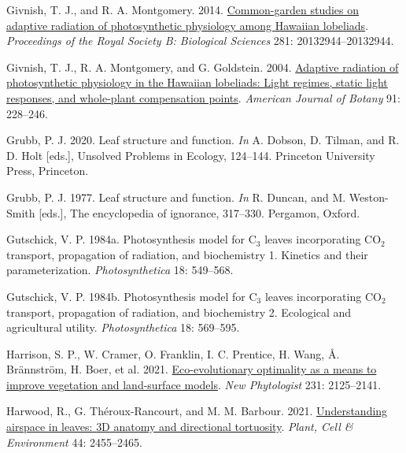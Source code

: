 \documentclass[
  letterpaper,
  DIV=11,
  numbers=noendperiod]{scrartcl}
\newlength{\cslhangindent}
\newlength{\cslentryspacingunit} %
\newenvironment{CSLReferences}[2] %
 {%
  \setlength{\parindent}{0pt}
  \ifodd #1
  \let\oldpar\par
  \def\par{\hangindent=\cslhangindent\oldpar}
  \fi
  \setlength{\parskip}{#2\cslentryspacingunit}
 }%
 {}
\begin{document}
\begin{CSLReferences}{1}{0}
\leavevmode{}%
Givnish, T. J., and R. A. Montgomery. 2014.
\href{https://doi.org/10.1098/rspb.2013.2944}{Common-garden studies on
adaptive radiation of photosynthetic physiology among {Hawaiian}
lobeliads}. \emph{Proceedings of the Royal Society B: Biological
Sciences} 281: 20132944--20132944.

\leavevmode{}%
Givnish, T. J., R. A. Montgomery, and G. Goldstein. 2004.
\href{https://doi.org/10.3732/ajb.91.2.228}{Adaptive radiation of
photosynthetic physiology in the {Hawaiian} lobeliads: Light regimes,
static light responses, and whole-plant compensation points}.
\emph{American Journal of Botany} 91: 228--246.

\leavevmode{}%
Grubb, P. J. 2020. Leaf structure and function. \emph{In} A. Dobson, D.
Tilman, and R. D. Holt {[}eds.{]}, Unsolved {Problems} in {Ecology},
124--144. Princeton University Press, Princeton.

\leavevmode{}%
Grubb, P. J. 1977. Leaf structure and function. \emph{In} R. Duncan, and
M. Weston-Smith {[}eds.{]}, The encyclopedia of ignorance, 317--330.
Pergamon, Oxford.

\leavevmode{}%
Gutschick, V. P. 1984a. Photosynthesis model for {C}\(_{\textrm{3}}\)
leaves incorporating {CO}\(_{\textrm{2}}\) transport, propagation of
radiation, and biochemistry 1. Kinetics and their parameterization.
\emph{Photosynthetica} 18: 549--568.

\leavevmode{}%
Gutschick, V. P. 1984b. Photosynthesis model for {C}\(_{\textrm{3}}\)
leaves incorporating {CO}\(_{\textrm{2}}\) transport, propagation of
radiation, and biochemistry 2. Ecological and agricultural utility.
\emph{Photosynthetica} 18: 569--595.

\leavevmode{}%
Harrison, S. P., W. Cramer, O. Franklin, I. C. Prentice, H. Wang, Å.
Brännström, H. Boer, et al. 2021.
\href{https://doi.org/10.1111/nph.17558}{Eco-evolutionary optimality as
a means to improve vegetation and land-surface models}. \emph{New
Phytologist} 231: 2125--2141.

\leavevmode{}%
Harwood, R., G. Théroux-Rancourt, and M. M. Barbour. 2021.
\href{https://doi.org/10.1111/pce.14079}{Understanding airspace in
leaves: {3D} anatomy and directional tortuosity}. \emph{Plant, Cell \&
Environment} 44: 2455--2465.


\end{CSLReferences}
\end{document}

